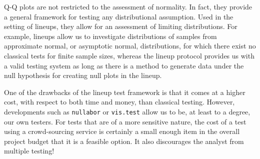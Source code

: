 \documentclass[12pt]{article}\usepackage[]{graphicx}\usepackage[]{color}
\begin{document}

Q-Q plots are not restricted to the assessment of normality. In fact, they provide a general framework for testing any distributional assumption. Used in the setting of lineups, they allow for an assessment of limiting distributions. For example, lineups allow us to investigate distributions of
 samples from approximate normal, or asymptotic normal, distributions, for which  there exist  no classical tests for finite sample sizes, whereas the lineup protocol provides us with a valid testing system
  as long as there is a method  to generate data under the null hypothesis for creating null plots in the lineup.
 

One of the drawbacks of the lineup test framework is that it comes at a higher cost, with respect to both time and money, than classical testing.
However, developments such as {\tt nullabor} \citep{nullabor} or {\tt vis.test} \citep{vistest} allow us to be, at least to a degree, our own testers. For tests that are of a more sensitive nature, the cost of a test using a crowd-sourcing service is certainly a small enough item in the overall project budget that it is a feasible 
option. It also discourages the analyst from multiple testing!
\end{document}
